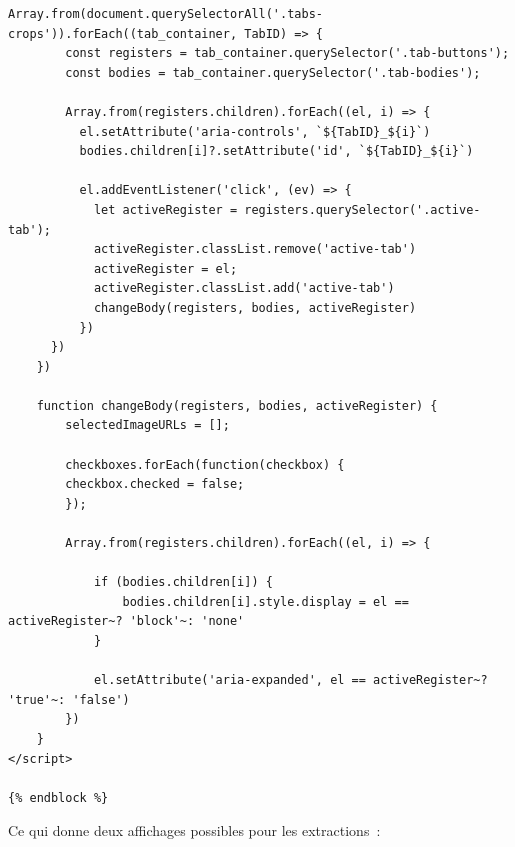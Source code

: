 \begin{lstlisting}[language=HTML5, frame=single, breaklines=true, caption={Template \html pour l'affichage des crops de diagrammes.}]
    Array.from(document.querySelectorAll('.tabs-crops')).forEach((tab_container, TabID) => {
        const registers = tab_container.querySelector('.tab-buttons');
        const bodies = tab_container.querySelector('.tab-bodies');

        Array.from(registers.children).forEach((el, i) => {
          el.setAttribute('aria-controls', `${TabID}_${i}`)
          bodies.children[i]?.setAttribute('id', `${TabID}_${i}`)

          el.addEventListener('click', (ev) => {
            let activeRegister = registers.querySelector('.active-tab');
            activeRegister.classList.remove('active-tab')
            activeRegister = el;
            activeRegister.classList.add('active-tab')
            changeBody(registers, bodies, activeRegister)
          })
      })
    })

    function changeBody(registers, bodies, activeRegister) {
        selectedImageURLs = [];

        checkboxes.forEach(function(checkbox) {
        checkbox.checked = false;
        });

        Array.from(registers.children).forEach((el, i) => {

            if (bodies.children[i]) {
                bodies.children[i].style.display = el == activeRegister~? 'block'~: 'none'
            }

            el.setAttribute('aria-expanded', el == activeRegister~? 'true'~: 'false')
        })
    }
</script>

{% endblock %}
\end{lstlisting}

Ce qui donne deux affichages possibles pour les extractions~: 

